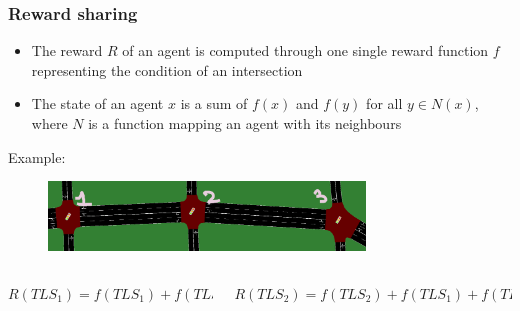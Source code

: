 \documentclass[dvipsnames]{beamer}
\begin{document}
\begin{frame}
\frametitle{Reward sharing}

  {\footnotesize
  \begin{itemize}
    \item The reward $R$ of an agent is computed through one single reward function $f$ representing the condition of an intersection \\
    \item The state of an agent $x$ is a sum of $f(x)$ and $f(y)$ for all $y \in N(x)$, where $N$ is a function mapping an agent with its neighbours \\
  \end{itemize}
  }

  Example:
  \begin{figure}
    \centering
    \includegraphics[width=0.75\textwidth]{figures/sumo-rf-tls-triplet.png}
  \end{figure}

  
  \begin{columns}
    \begin{column}{0.4\textwidth}
      \centering
      {\footnotesize$R({TLS}_{1}) = f({TLS}_{1}) + f({TLS}_{2})$}
    \end{column}
    \begin{column}{0.6\textwidth}
      \centering
      {\footnotesize$R({TLS}_{2}) = f({TLS}_{2}) + f({TLS}_{1}) + f({TLS}_{3})$}
    \end{column}
  \end{columns}
\end{frame}
\end{document}
